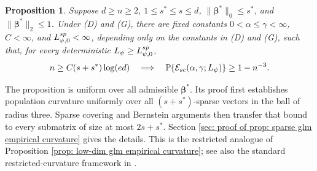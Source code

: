 \documentclass[letterpaper,12pt]{article}
\numberwithin{equation}{section}
\theoremstyle{plain}
\numberwithin{Theorem}{section}
\newtheorem{proposition}{Proposition}
\numberwithin{proposition}{section}
\numberwithin{Lemma}{section}
{
	\theoremstyle{definition}
	\newtheorem{Definition}{Definition}
	\newtheorem{example}{Example}
	\numberwithin{example}{section}
	\newtheorem{fact}{Fact}
	\numberwithin{fact}{section}
	\newtheorem{remark}{Remark}
}
\newcommand{\1}{\mathbbm{1}}
\def\bbeta{{\boldsymbol{\beta}}}
\def\Pr{\mathbb P}
\begin{document}
\begin{proposition}\label{prop: sparse glm empirical curvature}
	Suppose $d\geq n\geq2$, $1\leq s^*\leq s\leq d$, $\|\bbeta^*\|_0\leq s^*$, and $\|\bbeta^*\|_2\leq1$.  Under (D) and (G), there are fixed constants $0<\alpha\leq\gamma<\infty$, $C<\infty$, and $L_{\psi,0}^{\rm sp}<\infty$, depending only on the constants in (D) and (G), such that, for every deterministic $L_\psi\geq L_{\psi,0}^{\rm sp}$,
	\begin{align}
		n\geq C(s+s^*)\log(ed)
		\quad\Longrightarrow\quad
		\Pr\{\mathcal E_{\rm sc}(\alpha,\gamma;L_\psi)\}\geq1-n^{-3}.
		\label{eq: sparse glm empirical curvature probability}
	\end{align}
\end{proposition}

The proposition is uniform over all admissible $\bbeta^*$.  Its proof first establishes population curvature uniformly over all $(s+s^*)$-sparse vectors in the ball of radius three.  Sparse covering and Bernstein arguments then transfer that bound to every submatrix of size at most $2s+s^*$.  Section \ref{sec: proof of prop: sparse glm empirical curvature} gives the details.  This is the restricted analogue of Proposition \ref{prop: low-dim glm empirical curvature}; see also the standard restricted-curvature framework in \cite{loh2015regularized}.
\end{document}

